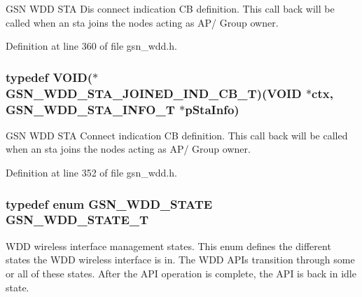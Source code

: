 GSN WDD STA Dis connect indication CB definition. This call back will be called when an sta joins the nodes acting as AP/ Group owner. 



Definition at line 360 of file gsn\_\-wdd.h.

\hypertarget{a00677_ga607917e8bad21deeb1564d9455d46f28}{
\subsubsection[{GSN\_\-WDD\_\-STA\_\-JOINED\_\-IND\_\-CB\_\-T}]{\setlength{\rightskip}{0pt plus 5cm}typedef VOID($\ast$ {\bf GSN\_\-WDD\_\-STA\_\-JOINED\_\-IND\_\-CB\_\-T})(VOID $\ast$ctx, {\bf GSN\_\-WDD\_\-STA\_\-INFO\_\-T} $\ast$pStaInfo)}}
\label{a00677_ga607917e8bad21deeb1564d9455d46f28}


GSN WDD STA Connect indication CB definition. This call back will be called when an sta joins the nodes acting as AP/ Group owner. 



Definition at line 352 of file gsn\_\-wdd.h.

\hypertarget{a00677_ga3a801c5847114c1bb6dc9cc1a0c5837e}{
\subsubsection[{GSN\_\-WDD\_\-STATE\_\-T}]{\setlength{\rightskip}{0pt plus 5cm}typedef enum {\bf GSN\_\-WDD\_\-STATE}  {\bf GSN\_\-WDD\_\-STATE\_\-T}}}
\label{a00677_ga3a801c5847114c1bb6dc9cc1a0c5837e}


WDD wireless interface management states. This enum defines the different states the WDD wireless interface is in. The WDD APIs transition through some or all of these states. After the API operation is complete, the API is back in idle state. 

